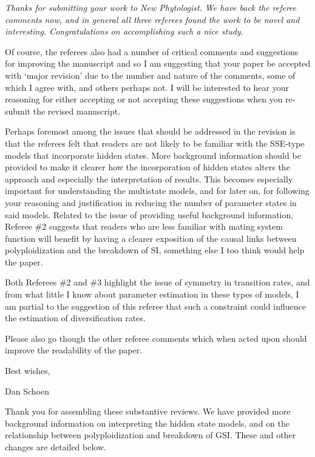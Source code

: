 \documentclass[11pt]{article}
\renewenvironment{quote}{\bigskip\noindent\itshape\ignorespaces}{\smallskip}
\begin{document}
\begin{quote}
Thanks for submitting your work to New Phytologist.
We have back the referee comments now, and in general all three referees found the work to be novel and interesting.
Congratulations on accomplishing such a nice study.

Of course, the referees also had a number of critical comments and suggestions for improving the manuscript and so I am suggesting that your paper be accepted with `major revision' due to the number and nature of the comments, some of which I agree with, and others perhaps not.
I will be interested to hear your reasoning for either accepting or not accepting these suggestions when you re-submit the revised manuscript.

Perhaps foremost among the issues that should be addressed in the revision is that the referees felt that readers are not likely to be familiar with the SSE-type models that incorporate hidden states.
More background information should be provided to make it clearer how the incorporation of hidden states alters the approach and especially the interpretation of results.
This becomes especially important for understanding the multistate models, and for later on, for following your reasoning and justification in reducing the number of parameter states in said models.
Related to the issue of providing useful background information, Referee \#2 suggests that readers who are less familiar with mating system function will benefit by having a clearer exposition of the causal links between polyploidization and the breakdown of SI, something else I too think would help the paper.

Both Referees \#2 and \#3 highlight the issue of symmetry in transition rates, and from what little I know about parameter estimation in these types of models, I am partial to the suggestion of this referee that such a constraint could influence the estimation of diversification rates.

Please also go though the other referee comments which when acted upon should improve the readability of the paper.

Best wishes,

Dan Schoen
\end{quote}

Thank you for assembling these substantive reviews.
We have provided more background information on interpreting the hidden state models, and on the relationship between polyploidization and breakdown of GSI.
These and other changes are detailed below.
\end{document}

